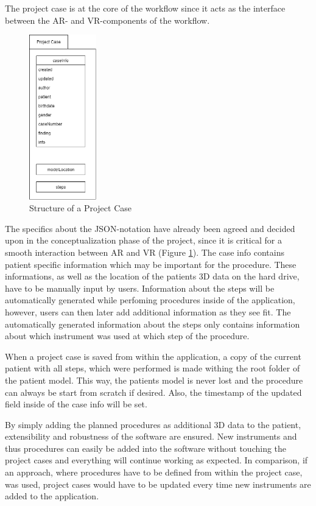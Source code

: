 The project case is at the core of the workflow since it acts as the interface between the AR- and VR-components of the workflow.

\begin{figure}[ht]
    \centering
    \includegraphics[width=110px]{images/implementation/project_case.png}
    \caption{\label{fig::ImplementationProjectCase}Structure of a Project Case}
\end{figure}

The specifics about the JSON-notation have already been agreed and decided upon in the conceptualization phase of the project, since it is critical for a smooth 
interaction between AR and VR (Figure \ref{fig::ImplementationProjectCase}). 
The case info contains patient specific information which may be important for the procedure.
These informations, as well as the location of the patients 3D data on the hard drive, have to be manually input by users.
Information about the steps will be automatically generated while perfoming procedures inside of the application, however, users can then later add additional information as they see fit.
The automatically generated information about the steps only contains information about which instrument was used at which step of the procedure.

When a project case is saved from within the application, a copy of the current patient with all steps, which were performed is made withing the root folder of the patient model.
This way, the patients model is never lost and the procedure can always be start from scratch if desired.
Also, the timestamp of the updated field inside of the case info will be set.

By simply adding the planned procedures as additional 3D data to the patient, extensibility and robustness of the software are ensured.
New instruments and thus procedures can easily be added into the software without touching the project cases and everything will continue working as expected.
In comparison, if an approach, where procedures have to be defined from within the project case, was used, project cases would have to be updated every time new 
instruments are added to the application.